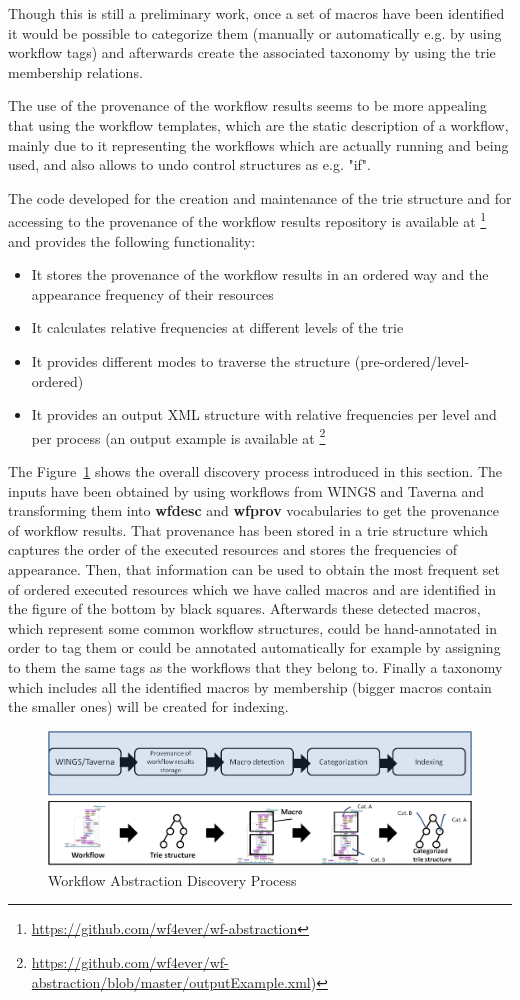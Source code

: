 Though this is still a preliminary work, once a set of macros have been identified it would be possible to categorize them (manually or automatically e.g. by using workflow tags) and afterwards create the associated taxonomy by using the trie membership relations.

The use of the provenance of the workflow results seems to be more appealing that using the workflow templates, which are the static description of a workflow, mainly due to it representing the workflows which are actually running and being used, and also allows to undo control structures as e.g. "if".

The code developed for the creation and maintenance of the trie structure and for accessing to the provenance of the workflow results repository is available at \footnote{\url{https://github.com/wf4ever/wf-abstraction}} and provides the following functionality:

\begin{itemize}
\item It stores the provenance of the workflow results in an ordered way and the appearance frequency of their resources
\item It calculates relative frequencies at different levels of the trie
\item It provides different modes to traverse the structure (pre-ordered/level-ordered)
\item It provides an output XML structure with relative frequencies per level and per process (an output example is available at \footnote{\url{https://github.com/wf4ever/wf-abstraction/blob/master/outputExample.xml})}
\end{itemize}

The Figure~\ref{fig:workflowAbstraction} shows the overall discovery process introduced in this section. The inputs have been obtained by using workflows from WINGS and Taverna and transforming them into \textbf{wfdesc} and \textbf{wfprov} vocabularies to get the provenance of workflow results. That provenance has been stored in a trie structure which captures the order of the executed resources and stores the frequencies of appearance. Then, that information can be used to obtain the most frequent set of ordered executed resources which we have called macros and are identified in the figure of the bottom by black squares. Afterwards these detected macros, which represent some common workflow structures, could be hand-annotated in order to tag them or could be annotated automatically for example by assigning to them the same tags as the workflows that they belong to. Finally a taxonomy which includes all the identified macros by membership (bigger macros contain the smaller ones) will be created for indexing.

\begin{figure}
\begin{center}
	\includegraphics[scale=0.5]{./Figures/workflowAbstraction}
		\caption{Workflow Abstraction Discovery Process}
		\label{fig:workflowAbstraction}
\end{center}
\end{figure}